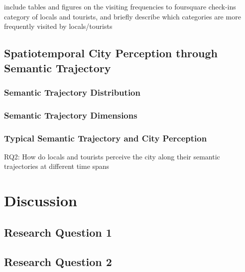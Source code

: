 \documentclass{article}
\begin{document}
include tables and figures on the visiting frequencies to foursquare check-ins category of locals and tourists, and briefly describe which categories are more frequently visited by locals/tourists

\subsection{Spatiotemporal City Perception through Semantic Trajectory}


\subsubsection{Semantic Trajectory Distribution}


\subsubsection{Semantic Trajectory Dimensions}


\subsubsection{Typical Semantic Trajectory and City Perception}

RQ2: How do locals and tourists perceive the city along their semantic trajectories at different time spans



\clearpage


\section{Discussion}
\subsection{Research Question 1}

\subsection{Research Question 2}
\end{document}
